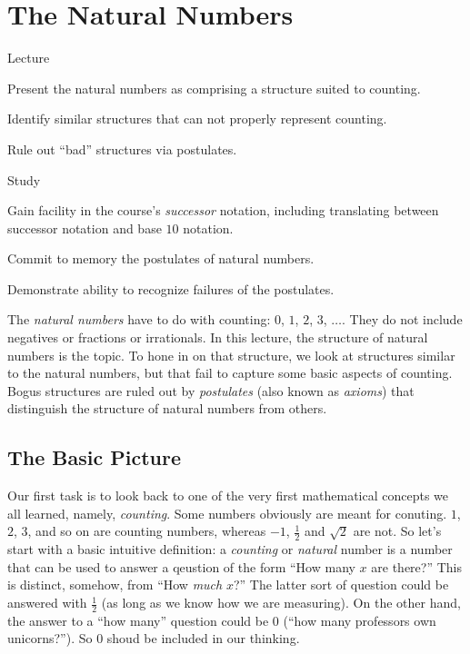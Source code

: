 

\chapter{The Natural Numbers}\label{lec:NaturalNumbers}

\begin{goals}
\begin{goal}{Lecture}
\item Present the natural numbers as comprising a structure suited to counting.
\item Identify similar structures that can not properly represent counting.
\item Rule out ``bad'' structures via postulates.
\end{goal}

\begin{goal}{Study}
\item Gain facility in the course's \emph{successor} notation, including
translating between successor notation and base $10$ notation.
\item Commit to memory the postulates of natural numbers.
\item Demonstrate ability to recognize failures of the postulates. 
\end{goal}
\end{goals}

The \emph{natural numbers} have to do with counting: $0$, $1$, $2$, $3$, $\ldots$.
They do not include negatives or fractions or irrationals.
In this lecture, the structure of natural numbers is the topic.
To hone in on that structure, we look at structures similar to the natural numbers, but that fail to capture some basic aspects of counting. 
Bogus structures are ruled out by \emph{postulates} (also known as \emph{axioms}) that distinguish the structure of natural numbers from others.

\section{The Basic Picture}

Our first task is to look back to one of the very first mathematical concepts we all learned, namely, \emph{counting}. Some numbers obviously are meant for conuting. $1$, $2$, $3$, and so on are counting numbers, whereas $-1$, $\frac{1}{2}$ and $\sqrt{2}$  are not. So let's start with a basic intuitive definition: a \emph{counting} or \emph{natural} number is a number that can be used to answer a qeustion of the form ``How many $x$ are there?''
This is distinct, somehow, from ``How \emph{much} $x$?'' The latter sort of question could be answered with $\frac{1}2$ (as long as we know how we are measuring). On the other hand, the answer to a ``how many'' question could be $0$ (``how many professors own unicorns?''). So $0$ shoud be included in our thinking.

